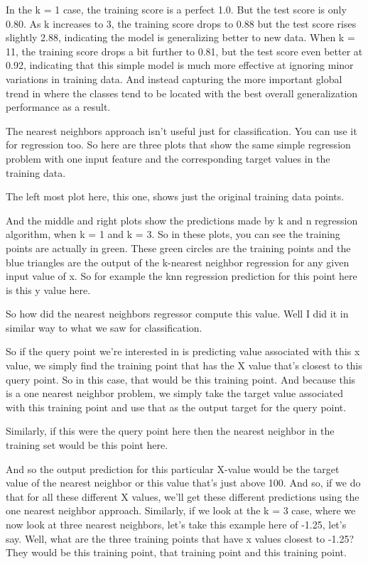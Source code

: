 \begin{multicols}{2}
In the k = 1 case, the training score is a perfect 1.0. But the test score is only 0.80. As k increases to 3, the training score drops to 0.88 but the test score rises slightly 2.88, indicating the model is generalizing better to new data. When k = 11, the training score drops a bit further to 0.81, but the test score even better at 0.92, indicating that this simple model is much more effective at ignoring minor variations in training data. And instead capturing the more important global trend in where the classes tend to be located with the best overall generalization performance as a result. 

The nearest neighbors approach isn't useful just for classification. You can use it for regression too. So here are three plots that show the same simple regression problem with one input feature and the corresponding target values in the training data. 

The left most plot here, this one, shows just the original training data points. 

And the middle and right plots show the predictions made by k and n regression algorithm, when k = 1 and k = 3. So in these plots, you can see the training points are actually in green. These green circles are the training points and the blue triangles are the output of the k-nearest neighbor regression for any given input value of x. So for example the knn regression prediction for this point here is this y value here. 

So how did the nearest neighbors regressor compute this value. Well I did it in similar way to what we saw for classification. 

So if the query point we're interested in is predicting value associated with this x value, we simply find the training point that has the X value that's closest to this query point. So in this case, that would be this training point. And because this is a one nearest neighbor problem, we simply take the target value associated with this training point and use that as the output target for the query point. 

Similarly, if this were the query point here then the nearest neighbor in the training set would be this point here. 

And so the output prediction for this particular X-value would be the target value of the nearest neighbor or this value that's just above 100. And so, if we do that for all these different X values, we'll get these different predictions using the one nearest neighbor approach. Similarly, if we look at the k = 3 case, where we now look at three nearest neighbors, let's take this example here of -1.25, let's say. Well, what are the three training points that have x values closest to -1.25? They would be this training point, that training point and this training point. 


\end{multicols}
